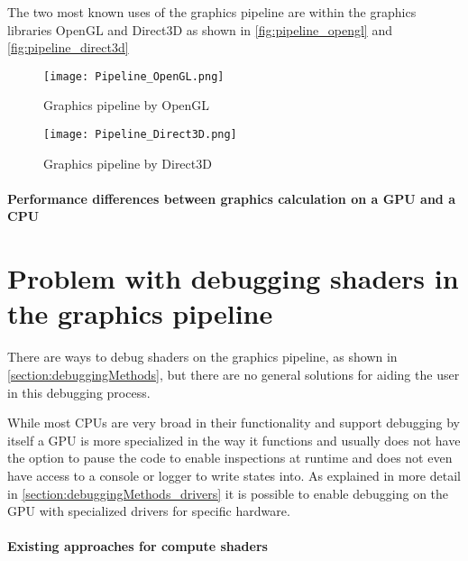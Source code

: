 The two most known uses of the graphics pipeline are within the graphics libraries OpenGL and Direct3D as shown in  \autoref{fig:pipeline_opengl} and \autoref{fig:pipeline_direct3d}

\begin{figure}[h!]
  \centering 
  \texttt{[image: Pipeline\_OpenGL.png]}
  \caption[Graphics pipeline by OpenGL ]{Graphics pipeline by OpenGL}
  \label{fig:pipeline_opengl}
\end{figure}

\begin{figure}[h!]
  \centering 
  \texttt{[image: Pipeline\_Direct3D.png]}
  \caption[Graphics pipeline by Direct3D ]{Graphics pipeline by Direct3D}
  \label{fig:pipeline_direct3d}
\end{figure}

\paragraph{Performance differences between graphics calculation on a GPU and a CPU}



\section{Problem with debugging shaders in the graphics pipeline}
\label{section:problems}

There are ways to debug shaders on the graphics pipeline, as shown in \autoref{section:debuggingMethods}, but there are no general solutions for aiding the user in this debugging process.

While most CPUs are very broad in their functionality and support debugging by itself a GPU is more specialized in the way it functions and usually does not have the option to pause the code to enable inspections at runtime and does not even have access to a console or logger to write states into. As explained in more detail in \autoref{section:debuggingMethods_drivers} it is possible to enable debugging on the GPU with specialized drivers for specific hardware.

\paragraph{Existing approaches for compute shaders}


